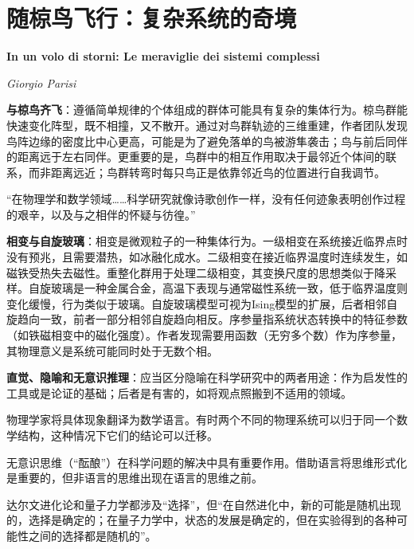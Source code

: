 \chapter{随椋鸟飞行：复杂系统的奇境}
\Large\textbf{In un volo di storni: Le meraviglie dei sistemi complessi}
\par \emph{Giorgio Parisi} \normalsize

\par \textbf{与椋鸟齐飞}：遵循简单规律的个体组成的群体可能具有复杂的集体行为。椋鸟群能快速变化阵型，既不相撞，又不散开。通过对鸟群轨迹的三维重建，作者团队发现鸟阵边缘的密度比中心更高，可能是为了避免落单的鸟被游隼袭击；鸟与前后同伴的距离远于左右同伴。更重要的是，鸟群中的相互作用取决于最邻近个体间的联系，而非距离远近；鸟群转弯时每只鸟正是依靠邻近鸟的位置进行自我调节。

“在物理学和数学领域……科学研究就像诗歌创作一样，没有任何迹象表明创作过程的艰辛，以及与之相伴的怀疑与彷徨。”

\par \textbf{相变与自旋玻璃}：相变是微观粒子的一种集体行为。一级相变在系统接近临界点时没有预兆，且需要潜热，如冰融化成水。二级相变在接近临界温度时连续发生，如磁铁受热失去磁性。重整化群用于处理二级相变，其变换尺度的思想类似于降采样。自旋玻璃是一种金属合金，高温下表现与通常磁性系统一致，低于临界温度则变化缓慢，行为类似于玻璃。自旋玻璃模型可视为Ising模型的扩展，后者相邻自旋趋向一致，前者一部分相邻自旋趋向相反。序参量指系统状态转换中的特征参数（如铁磁相变中的磁化强度）。作者发现需要用函数（无穷多个数）作为序参量，其物理意义是系统可能同时处于无数个相。

\par \textbf{直觉、隐喻和无意识推理}：应当区分隐喻在科学研究中的两者用途：作为启发性的工具或是论证的基础；后者是有害的，如将观点照搬到不适用的领域。

\par 物理学家将具体现象翻译为数学语言。有时两个不同的物理系统可以归于同一个数学结构，这种情况下它们的结论可以迁移。

\par 无意识思维（“酝酿”）在科学问题的解决中具有重要作用。借助语言将思维形式化是重要的，但非语言的思维出现在语言的思维之前。

\par 达尔文进化论和量子力学都涉及“选择”，但“在自然进化中，新的可能是随机出现的，选择是确定的；在量子力学中，状态的发展是确定的，但在实验得到的各种可能性之间的选择都是随机的”。